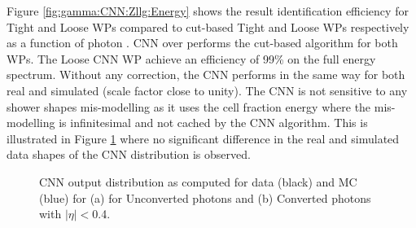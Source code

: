 Figure \ref{fig:gamma:CNN:Zllg:Energy} shows the result identification efficiency for Tight and Loose WPs compared to cut-based Tight and Loose WPs respectively as a function of photon \eT. CNN over performs the cut-based algorithm for both WPs. The Loose CNN WP achieve an efficiency of 99\% on the full energy spectrum. Without any correction, the CNN performs in the same way for both real and simulated (scale factor close to unity). The CNN is not sensitive to any shower shapes mis-modelling as it uses the cell fraction energy where the mis-modelling is infinitesimal and not cached by the CNN algorithm. This is illustrated in Figure \ref{fig:gamma:CNN:Zllg:CNNOutput} where no significant difference in the real and simulated data shapes of the CNN distribution is observed.
\begin{figure}[H]
    \caption{CNN output distribution as computed for data (black) and MC (blue) for (a) for Unconverted photons and (b) Converted photons with $|\eta|<$0.4.}
    \label{fig:gamma:CNN:Zllg:CNNOutput}
\end{figure}

